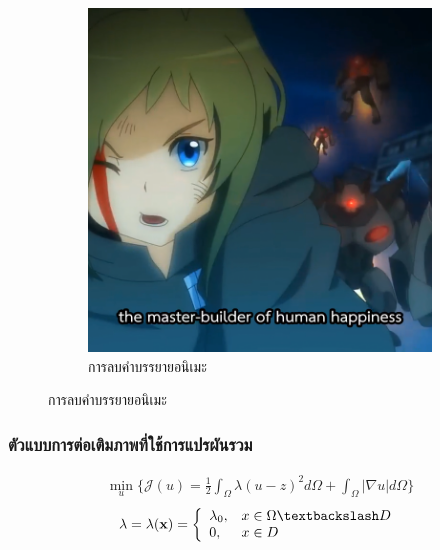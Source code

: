 \documentclass[xcolor=dvipsnames, xetex,serif]{beamer}
\numberwithin{equation}{section}
\begin{document}
\begin{frame}
\begin{figure}[H]
\begin{subfigure}{0.4\linewidth}
					\includegraphics[width=0.8\linewidth]{images/subtitle-remove/square.png}
					\caption*{{\large การลบคำบรรยายอนิเมะ}}
				\end{subfigure}
			\end{figure}
		\end{frame}
		\begin{frame}
			\frametitle{ตัวแบบการต่อเติมภาพที่ใช้การแปรผันรวม}
			\begin{align*}
			\min_{u} \{ \mathcal{J}(u) = \frac{1}{2} \int_{\Omega}\lambda (u-z)^2 d\Omega +  \int_{\Omega}  |\nabla u|  d\Omega \}
			\end{align*}
			 \vspace{1cm}
			\begin{align*}
			\lambda=\lambda(\mathbf{x}) = \left \{ \begin{array}{ll}  \lambda_0, & x \in \Omega \textbackslash D \\ 0, & x \in D  \end{array} \right . 
			\end{align*}
			\let\thefootnote\relax{}	
		\end{frame} 
\end{document}
